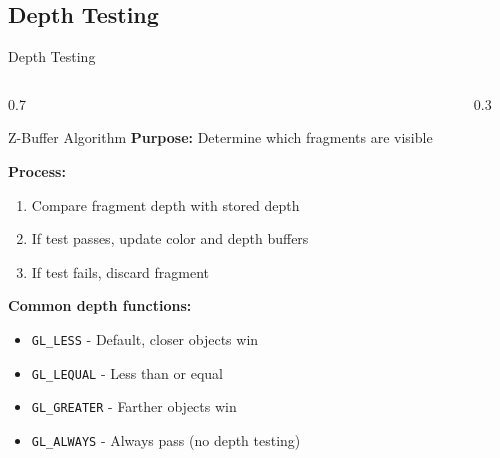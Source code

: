 \subsection{Depth Testing}
\begin{frame}{Depth Testing}
  \footnotesize
  \begin{columns}
    \begin{column}{0.7\textwidth}
      \begin{raybox}{Z-Buffer Algorithm}
        \textbf{Purpose:} Determine which fragments are visible

        \vspace{0.3cm}
        \textbf{Process:}
        \begin{enumerate}
          \item Compare fragment depth with stored depth
          \item If test passes, update color and depth buffers
          \item If test fails, discard fragment
        \end{enumerate}

        \vspace{0.3cm}
        \textbf{Common depth functions:}
        \begin{itemize}
          \item \texttt{GL\_LESS} - Default, closer objects win
          \item \texttt{GL\_LEQUAL} - Less than or equal
          \item \texttt{GL\_GREATER} - Farther objects win
          \item \texttt{GL\_ALWAYS} - Always pass (no depth testing)
        \end{itemize}
      \end{raybox}
    \end{column}
    \begin{column}{0.3\textwidth}
    \end{column}
  \end{columns}
\end{frame}

